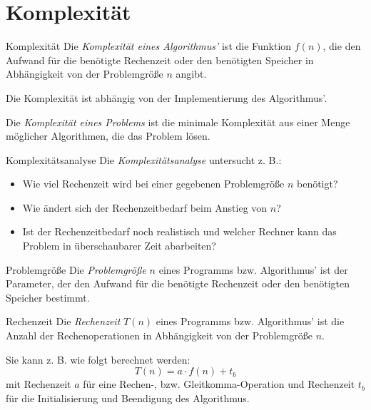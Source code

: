\section{Komplexität}\label{sec:komplexitaet}

\begin{defi}{Komplexität}
    Die \emph{Komplexität eines Algorithmus'} ist die Funktion $f(n)$, die den Aufwand für die benötigte Rechenzeit oder den benötigten Speicher in Abhängigkeit von der Problemgröße $n$ angibt.

    Die Komplexität ist abhängig von der Implementierung des Algorithmus'.

    Die \emph{Komplexität eines Problems} ist die minimale Komplexität aus einer Menge möglicher Algorithmen, die das Problem lösen.
\end{defi}

\begin{bonus}{Komplexitätsanalyse}
    Die \emph{Komplexitätsanalyse} untersucht z. B.:
    \begin{itemize}
        \item Wie viel Rechenzeit wird bei einer gegebenen Problemgröße $n$ benötigt?
        \item Wie ändert sich der Rechenzeitbedarf beim Anstieg von $n$?
        \item Ist der Rechenzeitbedarf noch realistisch und welcher Rechner kann das Problem in überschaubarer Zeit abarbeiten?
    \end{itemize}
\end{bonus}

\begin{defi}[Komplexität]{Problemgröße}
    Die \emph{Problemgröße} $n$ eines Programms bzw. Algorithmus' ist der Parameter, der den Aufwand für die benötigte Rechenzeit oder den benötigten Speicher bestimmt.
\end{defi}

\begin{defi}[Komplexität]{Rechenzeit}
    Die \emph{Rechenzeit} $T(n)$ eines Programms bzw. Algorithmus' ist die Anzahl der Rechenoperationen in Abhängigkeit von der Problemgröße $n$.

    Sie kann z. B. wie folgt berechnet werden:
    \[T(n) = a\cdot f(n) + t_b\]
    mit Rechenzeit $a$ für eine Rechen-, bzw. Gleitkomma-Operation und Rechenzeit $t_b$ für die Initialisierung und Beendigung des Algorithmus.
\end{defi}

